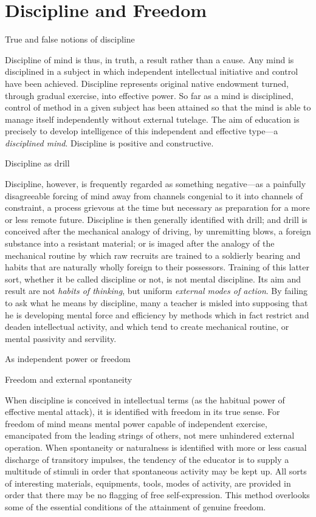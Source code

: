 \documentclass[letterpaper]{book}
\begin{document}
\section{Discipline and Freedom}

True and false notions of discipline

Discipline of mind is thus, in truth, a result rather than a cause. Any
mind is disciplined in a subject in which independent intellectual
initiative and control have been achieved. Discipline represents
original native endowment turned, through gradual exercise, into
effective power. So far as a mind is disciplined, control of method in a
given subject has been attained so that the mind is able to manage
itself independently without external tutelage. The aim of education is
precisely to develop intelligence of this independent and effective
type---a \emph{disciplined mind}. Discipline is positive and
constructive.

Discipline as drill

Discipline, however, is frequently regarded as something negative---as a
painfully disagreeable forcing of mind away from channels congenial to
it into channels of constraint, a process grievous at the time but
necessary as preparation for a more or less remote future. Discipline is
then generally identified with drill; and drill is conceived after the
mechanical analogy of driving, by unremitting blows, a foreign substance
into a resistant material; or is imaged after the analogy of the
mechanical routine by which raw recruits are trained to a soldierly
bearing and habits that are naturally wholly foreign to their
possessors. Training of this latter sort, whether it be called
discipline or not, is not mental discipline. Its aim and result are not
\emph{habits of thinking}, but uniform \emph{external modes of action}.
By failing to ask what he means by discipline, many a teacher is misled
into supposing that he is
developing
mental force and efficiency by methods which in fact restrict and deaden
intellectual activity, and which tend to create mechanical routine, or
mental passivity and servility.

As independent power or freedom

Freedom and external spontaneity

When discipline is conceived in intellectual terms (as the habitual
power of effective mental attack), it is identified with freedom in its
true sense. For freedom of mind means mental power capable of
independent exercise, emancipated from the leading strings of others,
not mere unhindered external operation. When spontaneity or naturalness
is identified with more or less casual discharge of transitory impulses,
the tendency of the educator is to supply a multitude of stimuli in
order that spontaneous activity may be kept up. All sorts of interesting
materials, equipments, tools, modes of activity, are provided in order
that there may be no flagging of free self-expression. This method
overlooks some of the essential conditions of the attainment of genuine
freedom.
\end{document}
